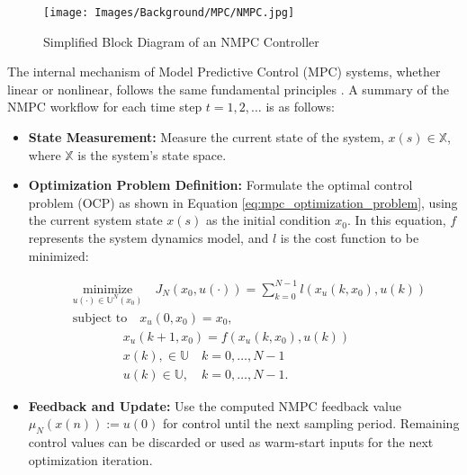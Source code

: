 \begin{figure}[h]
    \centering
    \texttt{[image: Images/Background/MPC/NMPC.jpg]}
    \caption{Simplified Block Diagram of an NMPC Controller}
    \label{fig:simplified_mpc_control_loop}
\end{figure}

The internal mechanism of Model Predictive Control (MPC) systems, whether linear or nonlinear, follows the same fundamental principles \cite{grune2017nonlinearmpc,schwenzer2021review}. A summary of the NMPC workflow for each time step \( t = 1, 2, \dots \) is as follows:

\begin{itemize}
    \item \textbf{State Measurement:} Measure the current state of the system, \( x(s) \in \mathbb{X} \), where \( \mathbb{X} \) is the system's state space.
    \item \textbf{Optimization Problem Definition:} Formulate the optimal control problem (OCP) as shown in Equation \ref{eq:mpc_optimization_problem}, using the current system state \( x(s) \) as the initial condition \( x_0 \). In this equation, \( f \) represents the system dynamics model, and \( l \) is the cost function to be minimized:

    \begin{equation}
        \begin{aligned}
            &\underset{u(\cdot) \in  \mathbb{U}^{N}(x_{0})}{\text{minimize}} \quad J_{N}(x_{0}, u(\cdot)) = \sum_{k=0}^{N-1} l(x_u(k, x_0), u(k)) \\
            &\text{subject to} \quad x_u(0, x_0) = x_0, \\
            &\quad \quad \quad \quad x_u(k+1, x_0) = f(x_u(k, x_0), u(k)) \\
            &\quad \quad \quad \quad x(k), \in \mathbb{U} \quad k = 0, \dots, N-1\\
            &\quad \quad \quad \quad u(k) \in \mathbb{U}, \quad k = 0, \dots, N-1.
        \end{aligned}
        \label{eq:mpc_optimization_problem}
    \end{equation}
    \item \textbf{Feedback and Update:} Use the computed NMPC feedback value \( \mu_{N}(x(n)) := u(0) \) for control until the next sampling period. Remaining control values can be discarded or used as warm-start inputs for the next optimization iteration.
\end{itemize}

